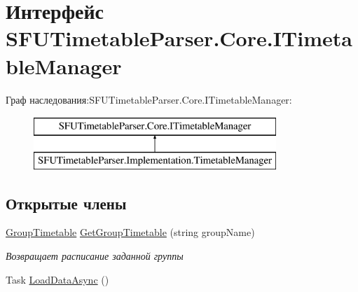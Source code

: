 \hypertarget{interface_s_f_u_timetable_parser_1_1_core_1_1_i_timetable_manager}{}\section{Интерфейс S\+F\+U\+Timetable\+Parser.\+Core.\+I\+Timetable\+Manager}
\label{interface_s_f_u_timetable_parser_1_1_core_1_1_i_timetable_manager}
Граф наследования\+:S\+F\+U\+Timetable\+Parser.\+Core.\+I\+Timetable\+Manager\+:\begin{figure}[H]
\begin{center}
\leavevmode
\includegraphics[height=2.000000cm]{interface_s_f_u_timetable_parser_1_1_core_1_1_i_timetable_manager}
\end{center}
\end{figure}
\subsection*{Открытые члены}
\begin{DoxyCompactItemize}
\item 
\hyperlink{class_s_f_u_timetable_parser_1_1_core_1_1_entities_1_1_group_timetable}{Group\+Timetable} \hyperlink{interface_s_f_u_timetable_parser_1_1_core_1_1_i_timetable_manager_aeb182ac554490f3c0db80691c1a8f739}{Get\+Group\+Timetable} (string group\+Name)
\begin{DoxyCompactList}\small\item\em Возвращает расписание заданной группы \end{DoxyCompactList}\item 
Task \hyperlink{interface_s_f_u_timetable_parser_1_1_core_1_1_i_timetable_manager_a4bc85e98ca57c83c9fa433036f064016}{Load\+Data\+Async} ()
\end{DoxyCompactItemize}
